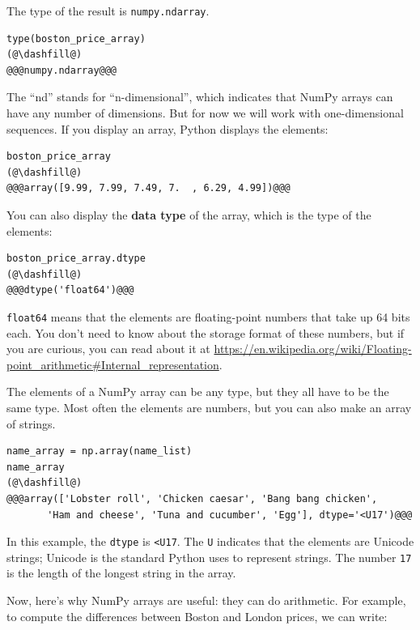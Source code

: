 The type of the result is \passthrough{\lstinline!numpy.ndarray!}.

\begin{lstlisting}[]
type(boston_price_array)
(@\dashfill@)
@@@numpy.ndarray@@@
\end{lstlisting}

The ``nd'' stands for ``n-dimensional'', which indicates that NumPy
arrays can have any number of dimensions. But for now we will work with
one-dimensional sequences. If you display an array, Python displays the
elements:

\begin{lstlisting}[]
boston_price_array
(@\dashfill@)
@@@array([9.99, 7.99, 7.49, 7.  , 6.29, 4.99])@@@
\end{lstlisting}

You can also display the \textbf{data type} of the array, which is the
type of the elements:

\begin{lstlisting}[]
boston_price_array.dtype
(@\dashfill@)
@@@dtype('float64')@@@
\end{lstlisting}

\passthrough{\lstinline!float64!} means that the elements are
floating-point numbers that take up 64 bits each. You don't need to know
about the storage format of these numbers, but if you are curious, you
can read about it at
\url{https://en.wikipedia.org/wiki/Floating-point_arithmetic\#Internal_representation}.

The elements of a NumPy array can be any type, but they all have to be
the same type. Most often the elements are numbers, but you can also
make an array of strings.

\begin{lstlisting}[]
name_array = np.array(name_list)
name_array
(@\dashfill@)
@@@array(['Lobster roll', 'Chicken caesar', 'Bang bang chicken',
       'Ham and cheese', 'Tuna and cucumber', 'Egg'], dtype='<U17')@@@
\end{lstlisting}

In this example, the \passthrough{\lstinline!dtype!} is
\passthrough{\lstinline!<U17!}. The \passthrough{\lstinline!U!}
indicates that the elements are Unicode strings; Unicode is the standard
Python uses to represent strings. The number
\passthrough{\lstinline!17!} is the length of the longest string in the
array.

Now, here's why NumPy arrays are useful: they can do arithmetic. For
example, to compute the differences between Boston and London prices, we
can write:

